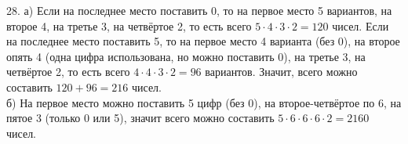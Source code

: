 28. а) Если на последнее место поставить 0, то на первое место 5 вариантов, на второе 4, на третье 3, на четвёртое 2, то есть всего $5\cdot4\cdot3\cdot2=120$ чисел. Если на последнее место поставить 5, то на первое место 4 варианта (без 0), на второе опять 4 (одна цифра использована, но можно поставить 0), на третье 3, на четвёртое 2, то есть всего $4\cdot4\cdot3\cdot2=96$ вариантов. Значит, всего можно составить $120+96=216$ чисел.\\
б) На первое место можно поставить 5 цифр (без 0), на второе-четвёртое по 6, на пятое 3 (только 0 или 5), значит всего можно составить $5\cdot6\cdot6\cdot6\cdot2=2160$ чисел.\\

